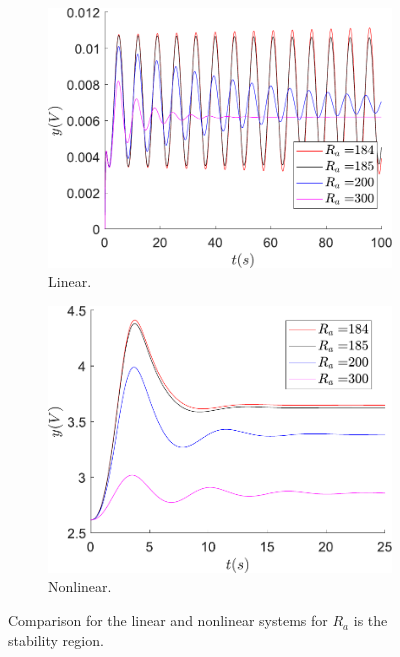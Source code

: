     \begin{figure}[ht]
        \centering
        \begin{subfigure}[b]{0.475\textwidth}
            \centering
            \includegraphics[scale=0.4]{figs/stab_Ra/Cambio_Ra_l_dentro.pdf}
            \caption{Linear.}
        \end{subfigure}
        \vskip0.1cm
        \begin{subfigure}[b]{0.475\textwidth}   
            \centering 
            \includegraphics[scale=0.4]{figs/stab_Ra/Cambio_Ra_nl_dentro.pdf}
            \caption{Nonlinear.}
        \end{subfigure}
        \caption{Comparison for the linear and nonlinear systems for $R_a$ is the stability region.}
        \label{fig:Ra_Dentro}
	\end{figure}
	
